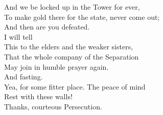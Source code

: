 \documentclass[a4paper,oneside,12pt]{memoir}
\begin{document}
\begin{drama*}
And we be locked up in the Tower for ever,\\
To make gold there for the state, never come out;\\
And then are you defeated.\\
\persecutionspeaks {} I will tell\\
This to the elders and the weaker sisters,\\
That the whole company of the Separation\\
May join in humble prayer again.\\
\subtlespeaks {} And fasting.\\
\persecutionspeaks Yea, for some fitter place. The peace of mind\\
Rest with these walls!\\
\subtlespeaks {} Thanks, courteous Persecution.\\

\scene


\end{drama*}
\end{document}
